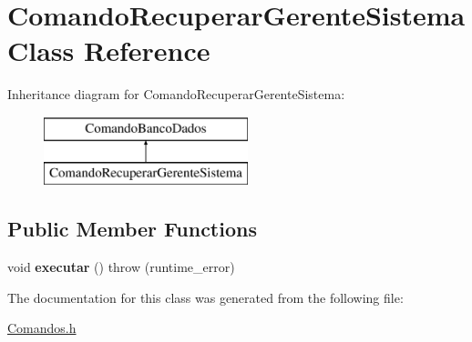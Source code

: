 \hypertarget{class_comando_recuperar_gerente_sistema}{}\section{Comando\+Recuperar\+Gerente\+Sistema Class Reference}
\label{class_comando_recuperar_gerente_sistema}
Inheritance diagram for Comando\+Recuperar\+Gerente\+Sistema\+:\begin{figure}[H]
\begin{center}
\leavevmode
\includegraphics[height=2.000000cm]{class_comando_recuperar_gerente_sistema}
\end{center}
\end{figure}
\subsection*{Public Member Functions}
\begin{DoxyCompactItemize}
\item 
\hypertarget{class_comando_recuperar_gerente_sistema_af16a4d4b63f3fc691039b88fb1ffc156}{}\label{class_comando_recuperar_gerente_sistema_af16a4d4b63f3fc691039b88fb1ffc156} 
void {\bfseries executar} ()  throw (runtime\+\_\+error)
\end{DoxyCompactItemize}


The documentation for this class was generated from the following file\+:\begin{DoxyCompactItemize}
\item 
\hyperlink{_comandos_8h}{Comandos.\+h}\end{DoxyCompactItemize}
